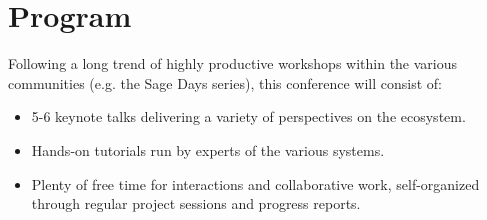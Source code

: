 \documentclass[12pt]{amsart}
\begin{document}
\section*{Program}

Following a long trend of highly productive workshops within the
various communities (e.g. the Sage Days series), this conference will consist of:
\begin{itemize}
\item 5-6 keynote talks delivering a variety of perspectives on the
  ecosystem.
\item Hands-on tutorials run by experts of the various systems.
\item Plenty of free time for interactions and collaborative work,
  self-organized through regular project sessions and progress
  reports.
\end{itemize}
\end{document}
